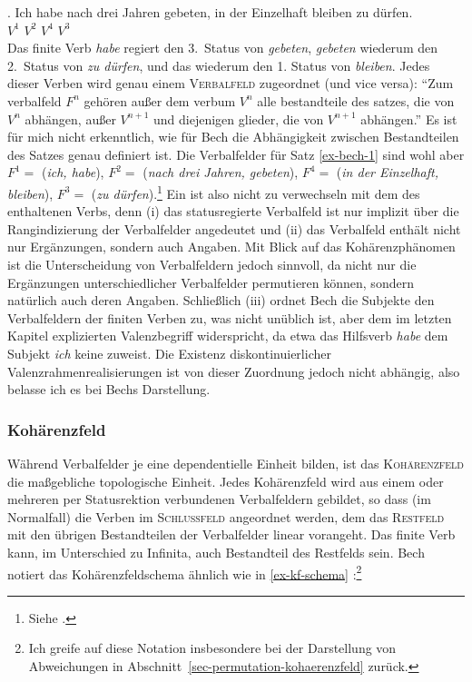 \exg. Ich habe nach drei Jahren gebeten, in der Einzelhaft bleiben {zu dürfen}.\\
{} $V^1$ {} {} {} $V^2$ {} {} {} $V^4$ $V^3$\label{ex-bech-1}\\

Das finite Verb {\it habe} regiert den 3.~Status von {\it gebeten}, {\it gebeten} wiederum den 2.~Status von {\it zu dürfen}, und das wiederum den 1. Status von {\it bleiben}. Jedes dieser Verben wird genau einem \textsc{Verbalfeld} zugeordnet (und vice versa): "`Zum verbalfeld $F^n$ gehören au\ss er dem verbum $V^n$ alle bestandteile des satzes, die von $V^n$ abhängen, au\ss er $V^{n+1}$ und diejenigen glieder, die von $V^{n+1}$ abhängen."' \cite[\S 36]{Bech:55} Es ist für mich nicht erkenntlich, wie für Bech die Abhängigkeit zwischen Bestandteilen des Satzes genau definiert ist. Die Verbalfelder für Satz \ref{ex-bech-1} sind wohl aber $F^1 =$ ({\it ich, habe}), $F^2 =$ ({\it nach drei Jahren, gebeten}), $F^4 =$ ({\it in der Einzelhaft, bleiben}), $F^3 =$ ({\it zu dürfen}).\footnote{Siehe \citet[\S 22]{Bech:55}.} Ein  ist also nicht zu verwechseln mit dem  des enthaltenen Verbs, denn (i) das statusregierte Verbalfeld ist nur implizit über die Rangindizierung der Verbalfelder angedeutet und (ii) das Verbalfeld enthält nicht nur Ergänzungen, sondern auch Angaben. Mit Blick auf das Kohärenzphänomen ist die Unterscheidung von Verbalfeldern jedoch sinnvoll, da nicht nur die Ergänzungen unterschiedlicher Verbalfelder permutieren können, sondern natürlich auch deren Angaben. Schlie\ss lich (iii) ordnet Bech die Subjekte den Verbalfeldern der finiten Verben zu, was nicht unüblich ist, aber dem im letzten Kapitel explizierten Valenzbegriff widerspricht, da etwa das Hilfsverb {\it habe} dem Subjekt {\it ich} keine  zuweist. Die Existenz diskontinuierlicher Valenzrahmenrealisierungen ist von dieser Zuordnung jedoch nicht abhängig, also belasse ich es bei Bechs Darstellung.  

\subsubsection*{Kohärenzfeld} 

Während Verbalfelder je eine dependentielle Einheit bilden, ist das \textsc{Kohärenzfeld} die ma\ss gebliche topologische Einheit. Jedes Kohärenzfeld wird aus einem oder mehreren per Statusrektion verbundenen Verbalfeldern gebildet, so dass (im Normalfall) die Verben im \textsc{Schlussfeld} angeordnet werden, dem das \textsc{Restfeld} mit den übrigen Bestandteilen der Verbalfelder linear vorangeht. Das finite Verb kann, im Unterschied zu Infinita, auch Bestandteil des Restfelds sein. Bech notiert das Kohärenzfeldschema ähnlich wie in \ref{ex-kf-schema} \citep[\S 55]{Bech:55}:\footnote{Ich greife auf diese Notation insbesondere bei der Darstellung von Abweichungen in Abschnitt~\ref{sec-permutation-kohaerenzfeld} zurück.}  

